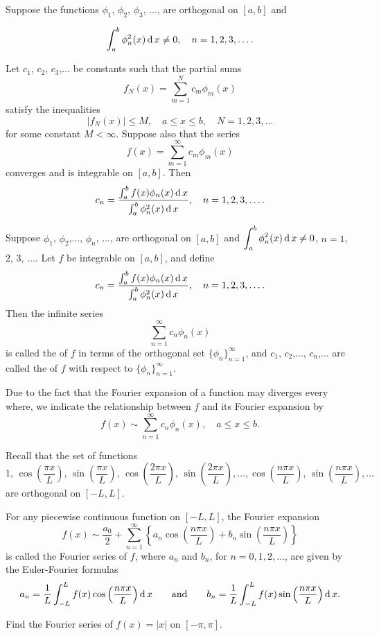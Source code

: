 \begin{theorem}
Suppose the functions $\phi_1$, $\phi_2$, $\phi_3$, ..., are orthogonal on $[a,b]$ and

\[\int_a^b\phi_n^2(x)\operatorname{d} x\ne0,\quad n=1,2,3,\dots.\]

Let $c_1$, $c_2$, $c_3$,... be constants such that the partial sums 
\[f_N(x)=\sum_{m=1}^N c_m\phi_m(x)\] 
satisfy the inequalities
\[|f_N(x)|\le M,\quad a\le x\le b,\quad N=1,2,3,\dots \]
for some constant $M<\infty.$ Suppose also that the series
\[f(x)=\sum_{m=1}^\infty c_m\phi_m(x)\]
converges and is integrable on $[a,b]$. Then
\[c_n=\dfrac{\int_a^bf(x)\phi_n(x)\operatorname{d} x}{\int_a^b\phi_n^2(x)\operatorname{d} x},\quad n=1,2,3,\dots.\]
\end{theorem}

Suppose $\phi_1$, $\phi_2$,..., $\phi_n$, ..., are orthogonal on $[a,b]$ and $\displaystyle \int_a^b\phi_n^2(x)\operatorname{d} x\ne0$, $n=1$, $2$, $3$, $\dots$. Let $f$ be integrable on $[a,b]$, and define
\[c_n=\dfrac{\int_a^bf(x)\phi_n(x)\operatorname{d} x}{\int_a^b\phi_n^2(x)\operatorname{d} x},\quad n=1,2,3,\dots.\]
Then the infinite series 
\[\sum_{n=1}^\infty c_n\phi_n(x)\] is called the  of $f$ in terms of the orthogonal set $\{\phi_n\}_{n=1}^\infty$, and $c_1$, $c_2$,..., $c_n$,... are called the  of $f$ with respect to $\{\phi_n\}_{n=1}^\infty$.

Due to the fact that the Fourier expansion of a function may diverges every where,  we indicate the relationship between $f$ and its Fourier expansion by
\[f(x)\sim\sum_{n=1}^\infty c_n\phi_n(x),\quad a\le x\le b.\]

Recall that the set of functions
\[1,\, \cos\left(\frac{\pi x}{L}\right),\, \sin\left(\frac{\pi x}{L}\right), \, \cos\left(\frac{2\pi x}{L}\right), \, \sin\left(\frac{2\pi x}{L}\right),\dots, \cos\left(\frac{n\pi x}{L}\right), \, \sin\left(\frac{n\pi x}{L}\right),\dots\]
are orthogonal on $[-L,L]$.

For any piecewise continuous function on $[-L, L]$, the Fourier expansion
\[f(x)\sim \frac{a_0}{2} + \sum\limits_{n=1}^\infty\left\{a_n\cos\left(\frac{n\pi x}{L}\right)+b_n\sin\left(\frac{n\pi x}{L}\right)\right\}\]
is called the Fourier series of $f$, where $a_n$ and $b_n$, for $n=0, 1, 2,\dots $, are given by the Euler-Fourier formulas
\[
  a_n=\frac{1}{L}\int_{-L}^Lf(x)\cos\left(\frac{n\pi x}{L}\right)\operatorname{d} x \qquad\text{and}\qquad
  b_n=\frac{1}{L}\int_{-L}^Lf(x)\sin\left(\frac{n\pi x}{L}\right)\operatorname{d} x.
\]

\begin{example}
  Find the Fourier series of $f(x)=|x|$ on $[-\pi,\pi]$.
\end{example}

